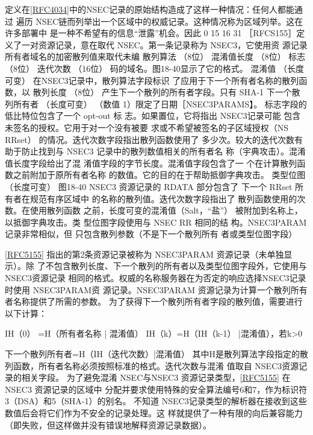 定义在\href{https://www.rfc-editor.org/rfc/rfc4034}{[RFC4034]}中的NSEC记录的原始结构造成了这样一种情况：任何人都能通过
遍历 NSEC链而列举出一个区域中的权威记录。这种情况称为区域列举。这在许多部署中
是一种不希望有的信息“泄露”机会。因此
0
15 16
31
［RFCS155］定义了一对资源记录，意在取代
NSEC。第一条记录称为 NSEC3，它使用资
源记录所有者域名的加密散列值来取代未编
散列算法
（8位）
混淆值长度
（8位）
标志
（8位）
迭代次数
（16位）
码的域名。图18-40显示了它的格式。
混淆值
（长度可变）
在NSEC3记录中，散列算法字段标识
了应用于下一个所有者名称的散列函数，以
散列长度
（8位）
产生下一个散列的所有者字段。只有 SHA-1
下一个散列所有者
（长度可变）
（数值 1）限定了日期［NSEC3PARAMS】。
标志字段的低比特位包含了一个 opt-out 标
志。如果置位，它将指出 NSEC3记录可能
包含未签名的授权。它用于对一个没有被要
求或不希望被签名的子区域授权（NS RRset）
的情况。迭代次数字段指出散列函数使用了
多少次。较大的迭代次数有助于防止找到与
NSEC3 记录中的散列数值相关的所有者名
称（宇典攻击）。混淆值长度字段给出了混
淆值字段的字节长度。混淆值字段包含了一
个在计算散列函数之前附加于原所有者名称
的数值。它的目的在于帮助抵御字典攻击。
类型位图
（长度可变）
图18-40
NSEC3 资源记录的 RDATA 部分包含了
下一个 RRset 所有者在规范有序区域中
的名称的散列值。迭代次数字段指出了
散列函数使用的次数。在使用散列函数
之前，长度可变的混淆值（Salt，“盐”）
被附加到名称上，以抵御字典攻击。类
型位图字段使用与 NSEC RR 相同的结
构。NSEC3PARAM 记录非常相似，但
只包含散列参数（不是下一个散列所有
者或类型位图字段）


\href{https://www.rfc-editor.org/rfc/rfc5155}{[RFC5155]} 指出的第2条资源记录被称为 NSEC3PARAM 资源记录（未单独显示）。除
了不包含散列长度、下一个散列的所有者以及类型位图字段外，它使用与NSEC3资源记录
相同的格式。权威的名称服务器在为否定的响应选择NSEC3记录时使用 NSEC3PARAM资
源记录。NSEC3PARAM 资源记录为计算一个散列所有者名称提供了所需的参数。
为了获得下一个散列所有者字段的散列值，需要进行以下计算：

IH（0） =H（所有者名称 | 混淆值）
IH（k）=H（IH（k-1） |混淆值），若k>0

下一个散列所有者=H（IH（迭代次数）|混淆值）
其中H是散列算法字段指定的散列函数，所有者名称必须按照标准的格式。迭代次数与混淆
值取自 NSEC3资源记录的相关字段。
为了避免混淆 NSEC与NSEC3 资源记录类型，\href{https://www.rfc-editor.org/rfc/rfc5155}{[RFC5155]} 在 NSEC3 资源记录的区域中
分配并要求使用特殊的安全算法编号6和7，作为标识符3（DSA）和5（SHA-1）的别名。
不知道 NSEC3记录类型的解析器在接收到这些数值后会将它们作为不安全的记录处理。这
样就提供了一种有限的向后兼容能力（即失败，但这样做并没有错误地解释资源记录数据）。

